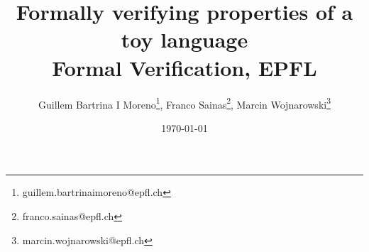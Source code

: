\documentclass[notitlepage]{article}
\title{Formally verifying properties of a toy language\\\large Formal Verification, EPFL}
\author{
	Guillem Bartrina I Moreno\thanks{guillem.bartrinaimoreno@epfl.ch},
	Franco Sainas\thanks{franco.sainas@epfl.ch},
	Marcin Wojnarowski\thanks{marcin.wojnarowski@epfl.ch}
}
\date{\today}
\begin{document}
\maketitle

\begin{abstract}
	\lipsum[1]
\end{abstract}
\end{document}
